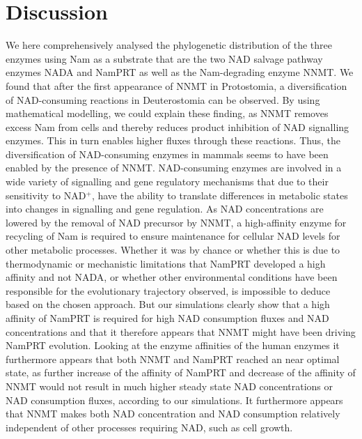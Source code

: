 
\section{Discussion}

We here comprehensively analysed the phylogenetic distribution of the three enzymes using Nam as a substrate that are the two NAD salvage pathway enzymes NADA and NamPRT as well as the Nam-degrading enzyme NNMT. We found that after the first appearance of NNMT in Protostomia, a diversification of NAD-consuming reactions in Deuterostomia can be observed. By using mathematical modelling, we could explain these finding, as NNMT removes excess Nam from cells and thereby reduces product inhibition of NAD signalling enzymes. This in turn enables higher fluxes through these reactions. Thus, the diversification of NAD-consuming enzymes in mammals seems to have been enabled by the presence of NNMT. NAD-consuming enzymes are involved in a wide variety of signalling and gene regulatory mechanisms that due to their sensitivity to NAD$^{+}$, have the ability to translate differences in metabolic states into changes in signalling and gene regulation. As NAD concentrations are lowered by the removal of NAD precursor by NNMT, a high-affinity enzyme for recycling of Nam is required to ensure maintenance for cellular NAD levels for other metabolic processes. Whether it was by chance or whether this is due to thermodynamic or mechanistic limitations that NamPRT developed a high affinity and not NADA, or whether other environmental conditions have been responsible for the evolutionary trajectory observed, is impossible to deduce based on the chosen approach. But our simulations clearly show that a high affinity of NamPRT is required for high NAD consumption fluxes and NAD concentrations and that it therefore appears that NNMT might have been driving NamPRT evolution. Looking at the enzyme affinities of the human enzymes it furthermore appears that both NNMT and NamPRT reached an near optimal state, as further increase of the affinity of NamPRT and decrease of the affinity of NNMT would not result in much higher steady state NAD concentrations or NAD consumption fluxes, according to our simulations. It furthermore appears that NNMT makes both NAD concentration and NAD consumption relatively independent of other processes requiring NAD, such as cell growth.


